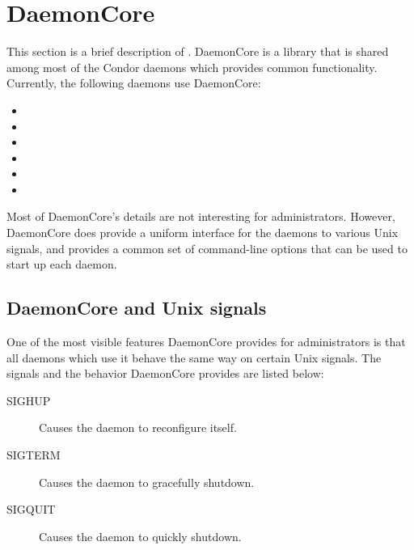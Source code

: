 \section{\label{sec:DaemonCore}DaemonCore}

This section is a brief description of .  DaemonCore
is a library that is shared among most of the Condor daemons which
provides common functionality.  Currently, the following daemons use
DaemonCore:

\begin{itemize}
\item {}
\item {}
\item {}
\item {}
\item {}
\item {}
\end{itemize}

Most of DaemonCore's details are not interesting for administrators.
However, DaemonCore does provide a uniform interface for the daemons
to various Unix signals, and provides a common set of command-line
options that can be used to start up each daemon.

\subsection{\label{sec:DaemonCore-Signals}DaemonCore and Unix signals}

One of the most visible features DaemonCore provides for
administrators is that all daemons which use it behave the same way on
certain Unix signals.  The signals and the behavior DaemonCore
provides are listed below:

\begin{description}
\item[SIGHUP] Causes the daemon to reconfigure itself.
\item[SIGTERM] Causes the daemon to gracefully shutdown.
\item[SIGQUIT] Causes the daemon to quickly shutdown.
\end{description}

